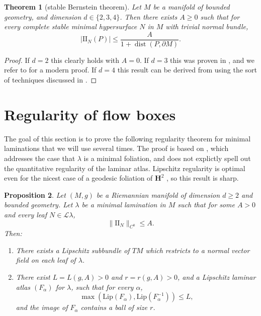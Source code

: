 \documentclass[reqno,11pt]{amsart}
\newcommand{\Hyp}{\mathbf H}
\DeclareMathOperator{\dist}{dist}
\newcommand{\Leaves}{\mathscr L}
\newcommand{\Two}{\mathrm{I\!I}}
\newcommand{\Lip}{\mathrm{Lip}}
\newtheorem{theorem}{Theorem}[section]
\newtheorem{proposition}[theorem]{Proposition}
\theoremstyle{definition}
\numberwithin{equation}{section}
\begin{document}
\begin{theorem}[stable Bernstein theorem]
	Let $M$ be a manifold of bounded geometry, and dimension $d \in \{2, 3, 4\}$.
	Then there exists $A \geq 0$ such that for every complete stable minimal hypersurface $N$ in $M$ with trivial normal bundle,
	$$|\Two_N(P)| \leq \frac{A}{1 + \dist(P, \partial M)}.$$
\end{theorem}
\begin{proof}
	If $d = 2$ this clearly holds with $A = 0$.
	If $d = 3$ this was proven in \cite{Schoen2016}, and we refer to \cite[Theorem 2.10]{colding2011course} for a modern proof.
	If $d = 4$ this result can be derived from \cite[Theorem 1]{Chodosh2021} using the sort of techniques discussed in \cite[\S3]{White13}.
\end{proof}


\section{Regularity of flow boxes}\label{Regularity}
The goal of this section is to prove the following regularity theorem for minimal laminations that we will use several times.
The proof is based on \cite[Theorem 1.1]{Solomon86}, which addresses the case that $\lambda$ is a minimal foliation, and does not explictly spell out the quantitative regularity of the laminar atlas.
Lipschitz regularity is optimal even for the nicest case of a geodesic foliation of $\Hyp^2$ \cite[\S1]{Solomon86}, so this result is sharp.

\begin{proposition}\label{regularity theorem}
Let $(M, g)$ be a Riemannian manifold of dimension $d \geq 2$ and bounded geometry.
Let $\lambda$ be a minimal lamination in $M$ such that for some $A > 0$ and every leaf $N \in \Leaves \lambda$,
$$\|\Two_N\|_{C^0} \leq A.$$
Then:
\begin{enumerate}
\item There exists a Lipschitz subbundle of $TM$ which restricts to a normal vector field on each leaf of $\lambda$.
\item There exist $L = L(g, A) > 0$ and $r = r(g, A) > 0$, and a Lipschitz laminar atlas $(F_\alpha)$ for $\lambda$, such that for every $\alpha$,
\begin{equation}\label{conorm of flow box}
	\max(\Lip(F_\alpha), \Lip(F_\alpha^{-1})) \leq L,
\end{equation}
and the image of $F_\alpha$ contains a ball of size $r$.
\end{enumerate}
\end{proposition}
\end{document}
